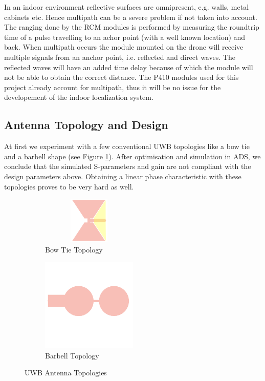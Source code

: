 \documentclass[a4paper]{article}        %
\begin{document}
	In an indoor environment reflective surfaces are omnipresent, e.g. walls, metal cabinets etc. Hence multipath can be a severe problem if not taken into account. The ranging done by the RCM modules is performed by measuring the roundtrip time of a pulse travelling to an achor point (with a well known location) and back. When multipath occurs the module mounted on the drone will receive multiple signals from an anchor point, i.e. reflected and direct waves. The reflected waves will have an added time delay because of which the module will not be able to obtain the correct distance. 
	The P410 modules used for this project already account for multipath, thus it will be no issue for the developement of the indoor localization system.  

	\subsection{Antenna Topology and Design}
	\label{subsec:ant_design}

	At first we experiment with a few conventional UWB topologies like a bow tie and a barbell shape (see Figure \ref{fig:topologies}). After optimisation and simulation in ADS, we conclude that the simulated S-parameters and gain are not compliant with the design parameters above. Obtaining a linear phase characteristic with these topologies proves to be very hard as well.  

		\begin{figure}[H]
		\begin{subfigure}{0.5\textwidth}
			\centering
			\includegraphics[width=0.5\textwidth,height=85px]{images/antenna/bow_tie.png}
			\caption{Bow Tie Topology}
		\end{subfigure}
		\begin{subfigure}{0.5\textwidth}
			\centering
			\includegraphics[width=0.5\textwidth]{images/antenna/bar_bell.png}
			\caption{Barbell Topology}
		\end{subfigure}
		\caption{UWB Antenna Topologies}
		\label{fig:topologies}
		\end{figure} 
\end{document}
